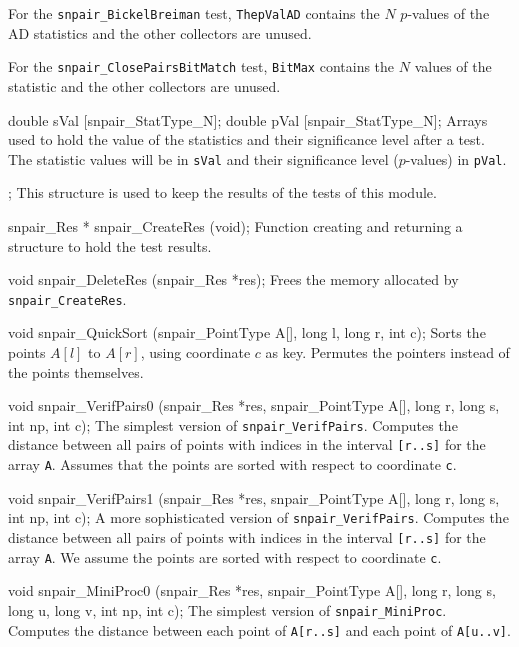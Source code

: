 {  For the {\tt snpair\_BickelBreiman} test, {\tt ThepValAD}
  contains the $N$ $p$-values of the AD statistics and the other
  collectors are unused. 

  For the {\tt snpair\_ClosePairsBitMatch} test, {\tt BitMax}
  contains the $N$ values of the statistic and the other
  collectors are unused.
  \endtabb
\code

   double sVal [snpair_StatType_N];
   double pVal [snpair_StatType_N];
\endcode
 \tabb
  Arrays used to hold the value of the
  statistics and their significance level after a test.
  The statistic values will be in 
  {\tt sVal} and their significance level
  ($p$-values) in {\tt pVal}.
 \endtabb
\code

};
\endcode
 \tab
  This structure is used to keep the results of 
  the tests of this module.
 \endtab
\code


snpair_Res * snpair_CreateRes (void);
\endcode
 \tab 
  Function creating and returning a structure to hold the test results.
 \endtab
\code


void snpair_DeleteRes (snpair_Res *res);
\endcode
 \tab 
  Frees the memory allocated by {\tt snpair\_CreateRes}.
 \endtab
\fi
\hide  %

\code

void snpair_QuickSort (snpair_PointType A[], long l, long r, int c);
\endcode
 \tab Sorts the points $A[l]$ to $A[r]$, using coordinate $c$
  as key.  Permutes the pointers instead of the points themselves.
 \endtab
\code


void snpair_VerifPairs0 (snpair_Res *res, snpair_PointType A[], long r, long s,
                         int np, int c);
\endcode
 \tab The simplest version of {\tt snpair\_VerifPairs}.
  Computes the distance between all pairs of points with indices in the
  interval {\tt [r..s]} for the array {\tt A}. 
  Assumes that the points are sorted with respect to coordinate {\tt c}.
\endtab
\code


void snpair_VerifPairs1 (snpair_Res *res, snpair_PointType A[], long r, long s,
                         int np, int c);
\endcode
 \tab A more sophisticated version of {\tt snpair\_VerifPairs}.
  Computes the distance between all pairs of points with indices in the
  interval {\tt [r..s]} for the array {\tt A}.
  We assume the points are sorted with respect to coordinate {\tt c}.
\endtab
\code


void snpair_MiniProc0 (snpair_Res *res, snpair_PointType A[], long r, long s,
                       long u, long v, int np, int c);
\endcode
 \tab The simplest version of {\tt snpair\_MiniProc}.
  Computes the distance between each point of {\tt A[r..s]} and each point
  of {\tt A[u..v]}. 
\endtab
\code


